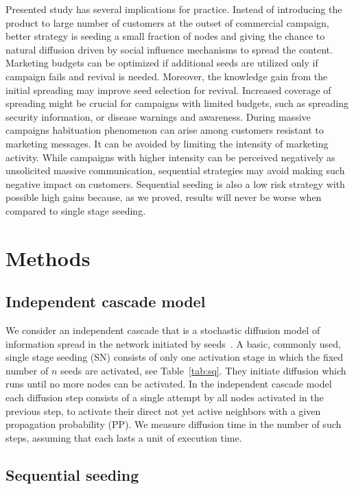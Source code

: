 \documentclass[11pt]{article} %
\begin{document}
Presented study has several implications for practice. Instead of introducing the product to large number of customers at the outset of commercial campaign, better strategy is seeding a small fraction of nodes and giving the chance to natural diffusion driven by social influence mechanisms to spread the content. Marketing budgets can be optimized if additional seeds are utilized only if campaign fails and revival is needed. Moreover, the knowledge gain from the initial spreading may improve seed selection for revival. Increased coverage of spreading might be crucial for campaigns with  limited budgets, such as spreading security information, or disease warnings and awareness. During massive campaigns habituation phenomenon can arise among customers resistant to marketing messages. It can be avoided by limiting the intensity of marketing activity. While campaigns with higher intensity can be perceived negatively as unsolicited massive communication, sequential strategies may avoid making such negative impact on customers. Sequential seeding is also a low risk strategy with possible high gains because, as we proved, results will never be worse when compared to single stage seeding.

\section*{Methods}

\subsection*{Independent cascade model}
We consider an independent cascade that is a stochastic diffusion model of information spread in the network initiated by seeds~\cite{Kempe:2003}. A basic, commonly used, single stage seeding (SN) consists of only one activation stage in which the fixed number of $n$ seeds are activated, see Table~\ref{tab:sq}. They initiate diffusion which runs until no more nodes can be activated. In the independent cascade model each diffusion step consists of a single attempt by all nodes activated in the previous step, to activate their direct not yet active neighbors with a given propagation probability (PP). We measure diffusion time in the number of such steps, assuming that each lasts a unit of execution time. 

\subsection*{Sequential seeding}
\end{document}
